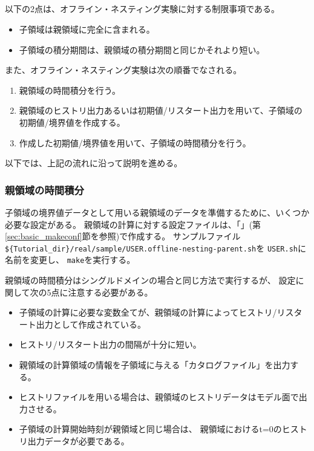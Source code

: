 \subsection{\SubsecOflineNesting} \label{subsec:nest_offline}

以下の2点は、オフライン・ネスティング実験に対する制限事項である。
\begin{itemize}
 \item 子領域は親領域に完全に含まれる。
 \item 子領域の積分期間は、親領域の積分期間と同じかそれより短い。
\end{itemize}
また、オフライン・ネスティング実験は次の順番でなされる。
\begin{enumerate}
 \item 親領域の時間積分を行う。
 \item 親領域のヒストリ出力あるいは初期値/リスタート出力を用いて、子領域の初期値/境界値を作成する。
 \item 作成した初期値/境界値を用いて、子領域の時間積分を行う。
\end{enumerate}
以下では、上記の流れに沿って説明を進める。

\subsubsection{親領域の時間積分}
子領域の境界値データとして用いる親領域のデータを準備するために、いくつか必要な設定がある。
親領域の計算に対する設定ファイルは、「\makeconftool」(第\ref{sec:basic_makeconf}節を参照)で作成する。
サンプルファイル\verb|${Tutorial_dir}/real/sample/USER.offline-nesting-parent.sh|を
\verb|USER.sh|に名前を変更し、 \verb|make|を実行する。

親領域の時間積分はシングルドメインの場合と同じ方法で実行するが、
設定に関して次の5点に注意する必要がある。

\begin{itemize}
 \item 子領域の計算に必要な変数全てが、親領域の計算によってヒストリ/リスタート出力として作成されている。
 \item ヒストリ/リスタート出力の間隔が十分に短い。
 \item 親領域の計算領域の情報を子領域に与える「カタログファイル」を出力する。
 \item ヒストリファイルを用いる場合は、親領域のヒストリデータはモデル面で出力させる。
 \item 子領域の計算開始時刻が親領域と同じ場合は、 親領域におけるt=0のヒストリ出力データが必要である。
\end{itemize}

